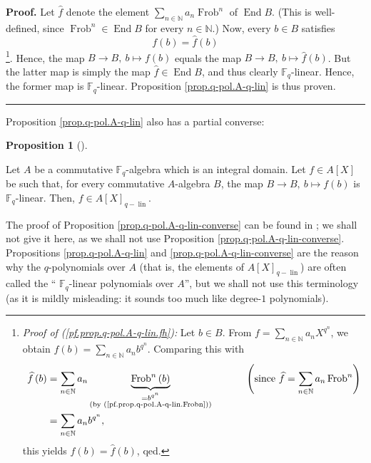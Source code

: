 \documentclass[numbers=enddot,12pt,final,onecolumn,notitlepage]{scrartcl}%
\theoremstyle{definition}
\newtheorem{prop}[theo]{Proposition}
\newenvironment{proposition}[1][]
{\begin{prop}[#1]\begin{leftbar}}
{\end{leftbar}\end{prop}}
\newenvironment{proof}[1][Proof]{\noindent\textbf{#1.} }{\ \rule{0.5em}{0.5em}}
\let\sumnonlimits\sum
\renewcommand{\sum}{\sumnonlimits\limits}
\begin{document}
\begin{proof}
Let $\widehat{f}$ denote the element $\sum_{n\in\mathbb{N}}a_{n}%
\operatorname*{Frob}\nolimits^{n}$ of $\operatorname*{End}B$. (This is
well-defined, since $\operatorname*{Frob}\nolimits^{n}\in\operatorname*{End}B$
for every $n\in\mathbb{N}$.) Now, every $b\in B$ satisfies%
\begin{equation}
f\left(  b\right)  =\widehat{f}\left(  b\right)
\label{pf.prop.q-pol.A-q-lin.fh}%
\end{equation}
\footnote{\textit{Proof of (\ref{pf.prop.q-pol.A-q-lin.fh}):} Let $b\in B$.
From $f=\sum_{n\in\mathbb{N}}a_{n}X^{q^{n}}$, we obtain $f\left(  b\right)
=\sum_{n\in\mathbb{N}}a_{n}b^{q^{n}}$. Comparing this with%
\begin{align*}
\widehat{f}\left(  b\right)   &  =\sum_{n\in\mathbb{N}}a_{n}%
\underbrace{\operatorname*{Frob}\nolimits^{n}\left(  b\right)  }%
_{\substack{=b^{q^{n}}\\\text{(by (\ref{pf.prop.q-pol.A-q-lin.Frobn}))}%
}}\ \ \ \ \ \ \ \ \ \ \left(  \text{since }\widehat{f}=\sum_{n\in\mathbb{N}%
}a_{n}\operatorname*{Frob}\nolimits^{n}\right) \\
&  =\sum_{n\in\mathbb{N}}a_{n}b^{q^{n}},
\end{align*}
this yields $f\left(  b\right)  =\widehat{f}\left(  b\right)  $, qed.}. Hence,
the map $B\rightarrow B,\ b\mapsto f\left(  b\right)  $ equals the map
$B\rightarrow B,\ b\mapsto\widehat{f}\left(  b\right)  $. But the latter map
is simply the map $\widehat{f}\in\operatorname*{End}B$, and thus clearly
$\mathbb{F}_{q}$-linear. Hence, the former map is $\mathbb{F}_{q}$-linear.
Proposition \ref{prop.q-pol.A-q-lin} is thus proven.
\end{proof}

Proposition \ref{prop.q-pol.A-q-lin} also has a partial converse:

\begin{proposition}
\label{prop.q-pol.A-q-lin-converse}Let $A$ be a commutative $\mathbb{F}_{q}%
$-algebra which is an integral domain. Let $f\in A\left[  X\right]  $ be such
that, for every commutative $A$-algebra $B$, the map $B\rightarrow
B,\ b\mapsto f\left(  b\right)  $ is $\mathbb{F}_{q}$-linear. Then, $f\in
A\left[  X\right]  _{q-\operatorname*{lin}}$.
\end{proposition}

The proof of Proposition \ref{prop.q-pol.A-q-lin-converse} can be found in
\cite[Corollary A.3]{kc-carlitz}; we shall not give it here, as we shall not
use Proposition \ref{prop.q-pol.A-q-lin-converse}. Propositions
\ref{prop.q-pol.A-q-lin} and \ref{prop.q-pol.A-q-lin-converse} are the reason
why the $q$-polynomials over $A$ (that is, the elements of $A\left[  X\right]
_{q-\operatorname*{lin}}$) are often called the \textquotedblleft%
$\mathbb{F}_{q}$-linear polynomials over $A$\textquotedblright, but we shall
not use this terminology (as it is mildly misleading: it sounds too much like
degree-$1$ polynomials).
\end{document}
